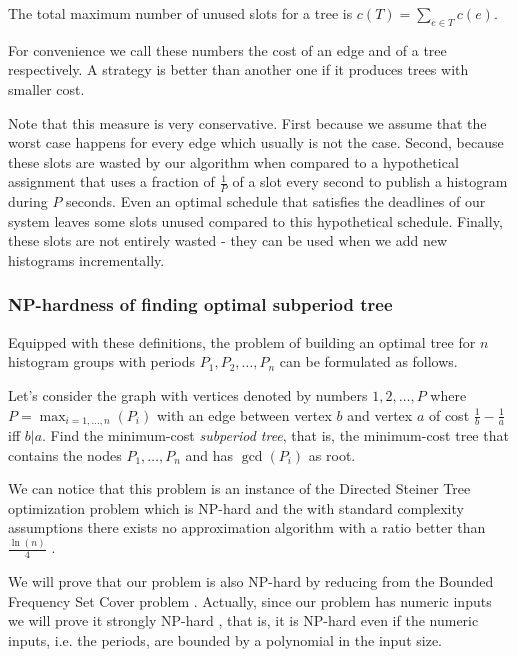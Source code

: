\begin{definition}
The total maximum number of unused slots for a tree is $c(T)=\sum_{e\in T}c(e)$. 
\end{definition}

For convenience we call these numbers the cost of an edge and of a tree respectively. A strategy is better than another one if it produces trees with smaller cost. 

Note that this measure is very conservative. First because we assume that the worst case happens for every edge which usually is not the case. Second, because these slots are wasted by our algorithm when compared to a hypothetical assignment that uses a fraction of $\frac 1 P$ of a slot every second to publish a histogram during $P$ seconds. Even an optimal schedule that satisfies the deadlines of our system leaves some slots unused compared to this hypothetical schedule. Finally, these slots are not entirely wasted - they can be used when we add new histograms incrementally.

\subsubsection*{NP-hardness of finding optimal subperiod tree}

Equipped with these definitions, the problem of building an optimal tree for $n$ histogram groups with periods $P_1, P_2, \ldots,P_n$ can be formulated as follows. 

\begin{problem}
Let's consider the graph with vertices denoted by numbers $1,2,\ldots ,P$ where $P=\max_{i=1,\ldots,n}(P_i)$ with an edge between vertex $b$ and vertex $a$ of cost $\frac 1 b -\frac 1 a$ iff $b \vert a$. Find the minimum-cost \emph{subperiod tree}, that is, the minimum-cost tree that contains the nodes $P_1,\ldots,P_n$ and has $\gcd(P_i)$ as root.
\end{problem}

We can notice that this problem is an instance of the Directed Steiner Tree optimization problem which is NP-hard and the with standard complexity assumptions there exists no approximation algorithm with a ratio better than $\frac {\ln (n)} 4$ \citep{zelikovsky1997series, ming2006fasterdsp}.

We will prove that our problem is also NP-hard by reducing from the Bounded Frequency Set Cover problem \citep{gary1979computers, cmulecture}. Actually, since our problem has numeric inputs we will prove it strongly NP-hard \citep{garey1978strong}, that is, it is NP-hard even if the numeric inputs, i.e. the periods, are bounded by a polynomial in the input size.

